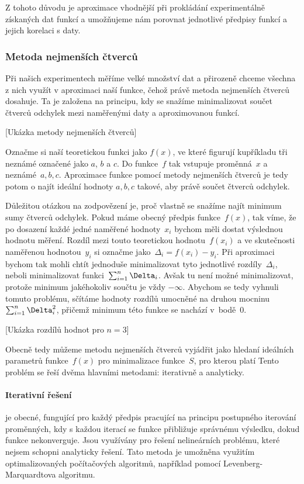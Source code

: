 Z tohoto důvodu je aproximace vhodnější při prokládání experimentálně získaných
dat funkcí a umožňujeme nám porovnat jednotlivé předpisy funkcí a jejich
korelaci s daty.

\subsubsection{Metoda nejmenších čtverců}
\label{sec:čtverce}
Při našich experimentech měříme velké množství dat a přirozeně chceme všechna
z nich využít v aproximaci naší funkce, čehož právě metoda nejmenších čtverců
dosahuje. Ta je založena na principu, kdy se snažíme minimalizovat součet
čtverců odchylek mezi naměřenými daty a aproximovanou funkcí.

[Ukázka metody nejmenších čtverců]

Označme si naší teoretickou funkci jako $f(x)$, ve které figurují kupříkladu
tři neznámé označené jako $a$, $b$ a $c$. Do funkce~$f$ tak vstupuje
proměnná~$x$ a neznámé~$a,b,c$. Aproximace funkce pomocí metody nejmenších
čtverců je tedy potom o najít ideální hodnoty $a,b,c$ takové, aby právě součet
čtverců odchylek.

Důležitou otázkou na zodpovězení je, proč vlastně se snažíme najít minimum sumy
čtverců odchylek. Pokud máme obecný předpis funkce~$f(x)$, tak víme, že po
dosazení každé jedné naměřené hodnoty~$x_i$ bychom měli dostat výslednou
hodnotu měření. Rozdíl mezi touto teoretickou hodnotu~$f(x_i)$ a ve skutečnosti
naměřenou hodnotou~$y_i$ si označme jako~$\Delta_i = f(x_i)-y_i$. Při
aproximaci bychom tak mohli chtít jednoduše minimalizovat tyto jednotlivé
rozdíly~$\Delta_i$, neboli minimalizovat funkci~$\nsum \Delta_i$. Avšak tu není
možné minimalizovat, protože minimum jakéhokoliv součtu je vždy $-\infty$.
Abychom se tedy vyhnuli tomuto problému, sčítáme hodnoty rozdílů umocněné na
druhou mocninu~$\nsum \Delta_i^2$, přičemž minimum této funkce se nachází
v~bodě~$0$.

[Ukázka rozdílů hodnot pro $n=3$]

Obecně tedy můžeme metodu nejmenších čtverců vyjádřit jako hledaní ideálních 
parametrů funkce~$f(x)$ pro minimalizace funkce~$S$, pro kterou platí
Tento problém se řeší dvěma hlavními metodami: iterativně a analyticky.

\paragraph{Iterativní řešení} je obecné, fungující pro každý předpis pracující
na principu postupného iterování proměnných, kdy s každou iterací se funkce
přibližuje správnému výsledku, dokud funkce nekonverguje. Jsou využívány pro
řešení nelineárních problému, které nejsem schopni analyticky řešení. Tato
metoda je umožněna využitím optimalizovaných počítačových algoritmů, například
pomocí Levenberg-Marquardtova algoritmu.

